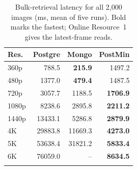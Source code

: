 \documentclass[pdflatex,sn-basic]{sn-jnl}%
\begin{document}
\begin{table}[htbp]
\color{markup}
\caption{Bulk-retrieval latency for all 2{,}000 images (ms, mean of five runs). Bold marks the fastest; Online Resource~1 gives the latest-frame reads.}\label{tab:read}
\small
\begin{tabular}{@{}lrrr@{}}
\toprule
Res. & Postgre & Mongo & PostMin \\
\midrule
360p  & 788.5 & \textbf{215.9} & 1497.2 \\
480p  & 1377.0 & \textbf{479.4} & 1487.5 \\
720p  & 3057.7 & 1188.5 & \textbf{1706.9} \\
1080p & 8238.6 & 2895.8 & \textbf{2211.2} \\
1440p & 13433.1 & 5286.8 & \textbf{2879.9} \\
4K    & 29883.8 & 11669.3 & \textbf{4273.0} \\
5K    & 53638.4 & 31821.2 & \textbf{5833.4} \\
6K    & 76059.0 & -- & \textbf{8634.5} \\
\botrule
\end{tabular}
\end{table}
\end{document}
